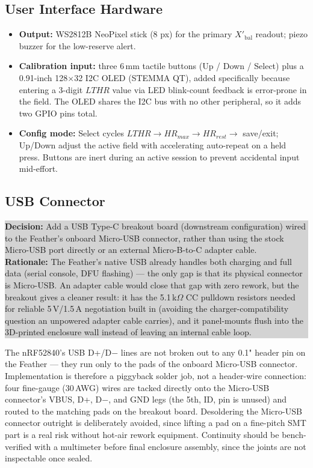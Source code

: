 \documentclass[11pt, letterpaper]{article}
\newcommand{\decision}[2]{%
  \par\vspace{0.4em}
  \noindent\colorbox{lightgray}{\parbox{0.97\linewidth}{\vspace{0.3em}
  \textbf{\color{trinityblue} Decision:} #1 \\[0.3em]
  \textbf{Rationale:} #2
  \vspace{0.3em}}}%
  \par\vspace{0.4em}
}
\begin{document}
\subsection{User Interface Hardware}
\label{sec:ui}

\begin{itemize}
  \item \textbf{Output:} WS2812B NeoPixel stick (8 px) for the primary $X'_{\mathrm{bal}}$
    readout; piezo buzzer for the low-reserve alert.
  \item \textbf{Calibration input:} three 6\,mm tactile buttons (Up / Down / Select) plus a
    0.91-inch 128$\times$32 I2C OLED (STEMMA QT), added specifically because entering a
    3-digit $LTHR$ value via LED blink-count feedback is error-prone in the field. The OLED
    shares the I2C bus with no other peripheral, so it adds two GPIO pins total.
  \item \textbf{Config mode:} Select cycles $LTHR \rightarrow HR_{max} \rightarrow HR_{rest}
    \rightarrow$ save/exit; Up/Down adjust the active field with accelerating auto-repeat on a
    held press. Buttons are inert during an active session to prevent accidental input
    mid-effort.
\end{itemize}

\subsection{USB Connector}
\label{sec:usbc}

\decision{Add a USB Type-C breakout board (downstream configuration) wired to the Feather's
onboard Micro-USB connector, rather than using the stock Micro-USB port directly or an external
Micro-B-to-C adapter cable.}
{The Feather's native USB already handles both charging and full data (serial console, DFU
flashing) --- the only gap is that its physical connector is Micro-USB. An adapter cable would
close that gap with zero rework, but the breakout gives a cleaner result: it has the 5.1\,k$\Omega$
CC pulldown resistors needed for reliable 5\,V/1.5\,A negotiation built in (avoiding the
charger-compatibility question an unpowered adapter cable carries), and it panel-mounts flush
into the 3D-printed enclosure wall instead of leaving an internal cable loop.}

The nRF52840's USB D+/D$-$ lines are not broken out to any 0.1" header pin on the Feather ---
they run only to the pads of the onboard Micro-USB connector. Implementation is therefore a
piggyback solder job, not a header-wire connection: four fine-gauge (30\,AWG) wires are tacked
directly onto the Micro-USB connector's VBUS, D+, D$-$, and GND legs (the 5th, ID, pin is
unused) and routed to the matching pads on the breakout board. Desoldering the Micro-USB
connector outright is deliberately avoided, since lifting a pad on a fine-pitch SMT part is a
real risk without hot-air rework equipment. Continuity should be bench-verified with a
multimeter before final enclosure assembly, since the joints are not inspectable once sealed.
\end{document}
